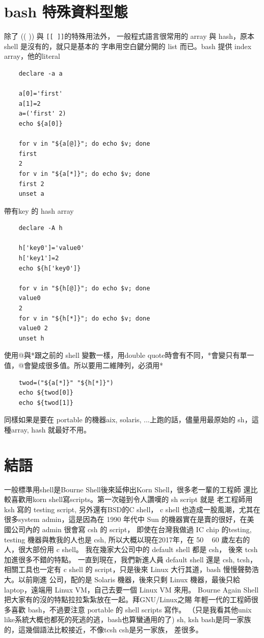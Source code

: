     \section{bash 特殊資料型態}
    除了 (( )) 與 \verb=[[ ]]=的特殊用法外，
    一般程式語言很常用的 array 與 hash，原本 shell 是沒有的，就只是基本的
    字串用空白鍵分開的 list 而已。bash 提供 index array，他的literal
    \begin{verbatim}
    declare -a a

    a[0]='first'
    a[1]=2
    a=('first' 2)
    echo ${a[0]}

    for v in "${a[@]}"; do echo $v; done
    first
    2
    for v in "${a[*]}"; do echo $v; done
    first 2
    unset a
    \end{verbatim}
    帶有key 的 hash array
    \begin{verbatim}
    declare -A h

    h['key0']='value0'
    h['key1']=2
    echo ${h['key0']}

    for v in "${h[@]}"; do echo $v; done
    value0
    2
    for v in "${h[*]}"; do echo $v; done
    value0 2
    unset h
    \end{verbatim}
    使用@與*跟之前的 shell 變數一樣，用double quote時會有不同，*會變只有單一
    值，@會變成很多值。所以要用二維陣列，必須用*
    \begin{verbatim}
    twod=("${a[*]}" "${h[*]}")
    echo ${twod[0]}
    echo ${twod[1]}
    \end{verbatim}
    同樣如果是要在 portable 的機器aix, solaris, ...上跑的話，儘量用最原始的
    sh，這種array, hash 就最好不用。

    \section{結語}
    一般標準用shell是Bourne Shell後來延伸出Korn Shell，很多老一輩的工程師
    還比較喜歡用korn shell寫scripts。第一次碰到令人讚嘆的 sh script 就是
    老工程師用 ksh 寫的 testing script, 另外還有BSD的C shell，
    c shell 也造成一股風潮，尤其在很多system admin，這是因為在 1990 年代中
    Sun 的機器實在是賣的很好，在美國公司內的 admin 很會寫 csh 的 script，
    即使在台灣我做過 IC chip 的testing, testing 機器與教我的人也是 csh,
    所以大概以現在2017年，在 50 ~ 60 歲左右的人，很大部份用 c shell。
    我在幾家大公司中的 default shell 都是 csh， 後來 tcsh 加進很多不錯的特點。
    一直到現在，我們新進人員 default shell 還是 csh, tcsh，相關工具也一定有
    c shell 的 script，只是後來 Linux 大行其道，bash 慢慢聲勢浩大。以前剛進
    公司，配的是 Solaris 機器，後來只剩 Linux 機器，最後只給 laptop，遠端用
    Linux VM，自己去要一個 Linux VM 來用。
    Bourne Again Shell 把大家有的沒的特點拉拉紮紮放在一起。拜GNU/Linux之賜
    年輕一代的工程師很多喜歡 bash，不過要注意 portable 的 shell scripts 寫作。
    （只是我看其他unix like系統大概也都死的死逃的逃，bash也算蠻通用的了)
    sh, ksh bash是同一家族的，這幾個語法比較接近，不像tcsh csh是另一家族，
    差很多。
